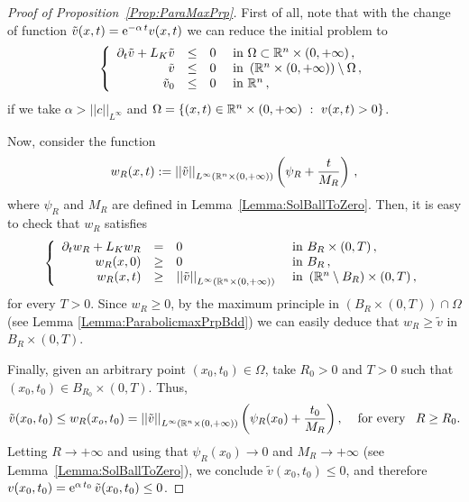 \begin{proof}[Proof of Proposition~\ref{Prop:ParaMaxPrp}]
First of all, note that with the change of function $\tilde{v}(x,t) = \mathrm{e}^{-\alpha\,t} v(x,t)$ we can reduce the initial problem to
\begin{equation*}
\left\{\begin{array}{rcll}
\partial_t \tilde{v} + L_K  \tilde{v} &\leq& 0 & \textrm{ in } \Omega \subset\mathbb{R}^n\times(0,+\infty)\,,\\
\tilde{v} &\leq& 0 & \textrm{ in }  \left(\mathbb{R}^n\times(0,+\infty)\right) \setminus  \Omega\,,\\
\tilde{v}_0 &\leq& 0 & \textrm{ in } \mathbb{R}^n\,,
\end{array} \right.
\end{equation*}
if we take $\alpha > ||c||_{L^\infty}$ and $\Omega = \{(x,t)\in \mathbb{R}^n\times(0,+\infty) \ : \ v(x,t) > 0\}$.

Now, consider the function 
$$ 
w_R(x,t) := \left | \left |{\tilde{v} } \right | \right |_{L^\infty(\mathbb{R}^n \times (0,+\infty))} \left( \psi_R + \dfrac{t}{M_R} \right)\,,
$$
where $\psi_R$ and $M_R$ are defined in Lemma~\ref{Lemma:SolBallToZero}. Then, it is easy to check that $w_R$ satisfies
\begin{equation*}
\left\{\begin{array}{rcll}
\partial_t w_R + L_K  w_R &=& 0 & \textrm{ in }B_R\times(0,T)\,,\\
w_R(x,0) &\geq& 0 & \textrm{ in } B_R\,,\\
w_R(x,t) &\geq& \left | \left |{\tilde{v}} \right | \right |_{L^\infty(\mathbb{R}^n \times (0,+\infty))}  & \textrm{ in } \left( \mathbb{R}^n\setminus B_R\right) \times (0,T) \,,
\end{array} \right.
\end{equation*}
for every $T>0$. Since $w_R \geq 0$, by the maximum principle in $(B_R\times (0,T))\cap \Omega$ (see Lemma \ref{Lemma:ParabolicmaxPrpBdd}) we can easily deduce that $ w_R\geq \tilde{v} $ in $B_R\times(0,T)$.

Finally, given an arbitrary point $(x_0,t_0) \in \Omega$, take $R_0>0$ and $T>0$ such that $(x_0,t_0)\in B_{R_0}\times (0,T)$. Thus,
$$ 
\tilde{v}(x_0,t_0) \leq w_R(x_o,t_0) =  \left | \left |{\tilde{v} } \right | \right |_{L^\infty(\mathbb{R}^n \times (0,+\infty))} \left( \psi_R (x_0) + \dfrac{t_0}{M_R} \right), \,\,\,\,\,\text{ for every }\,\,\, R\geq R_0.
$$
Letting $R \to +\infty$ and using that $\psi_R(x_0) \to 0$ and $M_R \to +\infty$ (see Lemma~\ref{Lemma:SolBallToZero}), we conclude $ \tilde{v}(x_0,t_0) \leq  0$, and therefore $ v(x_0,t_0) = \mathrm{e}^{\alpha\,t_0}\,\tilde{v}(x_0,t_0) \leq 0$.
\end{proof}



